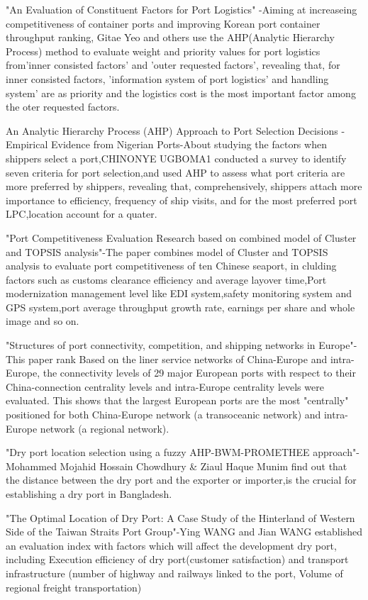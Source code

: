 \documentclass[preprint]{elsarticle}
\begin{document}
"An Evaluation of Constituent Factors for Port Logistics" -Aiming at increaseing competitiveness of container ports and improving Korean port container throughput ranking, Gitae Yeo and others use the AHP(Analytic Hierarchy Process) method to evaluate weight and priority values for port logistics from'inner consisted factors' and 'outer requested factors', revealing that, for inner consisted factors, 'information system of port logistics' and handling system' are as priority and the logistics cost is the most important factor among the oter requested factors.

An Analytic Hierarchy Process (AHP) Approach to Port Selection Decisions - Empirical Evidence from Nigerian Ports-About studying the factors when shippers select a port,CHINONYE UGBOMA1 conducted a survey to identify seven criteria for port selection,and used AHP to assess what port criteria are more preferred by shippers, revealing that, comprehensively, shippers attach more importance to efficiency, frequency of ship visits, and for the most preferred port LPC,location account for a quater.

"Port Competitiveness Evaluation Research based on combined model of Cluster and TOPSIS analysis"-The paper combines model of Cluster and TOPSIS analysis to evaluate port competitiveness of ten Chinese seaport, in clulding factors such as customs clearance efficiency and average layover time,Port modernization  management level like EDI system,safety monitoring system and GPS system,port average throughput growth rate, earnings per share and whole image and so on.

% 
"Structures of port connectivity, competition, and shipping networks in Europe"-This paper rank Based on the liner service networks of China-Europe and intra-Europe, the connectivity levels of 29 major European ports with respect to their China-connection centrality levels and intra-Europe centrality levels were evaluated. This shows that the largest European ports are the most "centrally" positioned for both China-Europe network (a transoceanic network) and intra-Europe network (a regional network).

"Dry port location selection using a fuzzy AHP-BWM-PROMETHEE approach"-Mohammed Mojahid Hossain Chowdhury \& Ziaul Haque Munim find out that the distance between the dry port and the exporter or importer,is the crucial for establishing a dry port in Bangladesh.

"The Optimal Location of Dry Port: A Case Study of the Hinterland of Western Side of the Taiwan Straits Port Group"-Ying WANG and Jian WANG established an evaluation index with factors which will affect the development dry port, including Execution efficiency of dry port(customer satisfaction) and transport infrastructure (number of highway and railways linked to the port, Volume of regional freight transportation)
% 
% 
% 
% 
% 
% 
% 
% 
\end{document}
